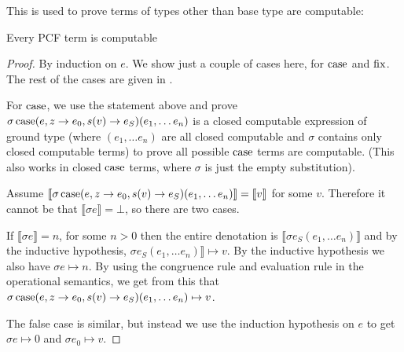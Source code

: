 
This is used to prove terms of types other than base type are computable:

\vspace{0.5cm}

\begin{thm}
Every PCF term is computable
\end{thm}

\begin{proof}
By induction on $e$. We show just a couple of cases here, for $\operatorname{case}$ and $\operatorname{fix}$. The rest of the cases are given in \citep{Gunter92}.

For $\operatorname{case}$, we use the statement above and prove $\sigma \operatorname{case}(e, z \to e_0, s(v) \to e_S)(e_1, \dots e_n)$ is a closed computable expression of ground type (where $(e_1, \dots e_n)$ are all closed  computable and $\sigma$ contains only closed computable terms) to prove all possible $\operatorname{case}$ terms are computable. (This also works in closed $\operatorname{case}$ terms, where $\sigma$ is just the empty substitution).  

Assume $\llbracket  \sigma \operatorname{case}(e, z \to e_0, s(v) \to e_S)(e_1, \dots e_n) \rrbracket = \llbracket v \rrbracket$ for some $v$. Therefore it cannot be that $\llbracket \sigma e \rrbracket = \bot$, so there are two cases.

If $\llbracket \sigma e \rrbracket = n$, for some $n > 0$ then the entire denotation is $\llbracket \sigma e_S (e_1, \dots e_n) \rrbracket$ and by the inductive hypothesis,  $\sigma e_S (e_1, \dots e_n) \rrbracket \mapsto v$. By the inductive hypothesis we also have $\sigma e \mapsto n$. By using the congruence rule and evaluation rule in the operational semantics, we get from this that $\sigma \operatorname{case}(e, z \to e_0, s(v) \to e_S)(e_1, \dots e_n) \mapsto v$.

The false case is similar, but instead we use the induction hypothesis on $e$ to get $\sigma e \mapsto 0$ and $\sigma e_0 \mapsto v$.



\end{proof}
